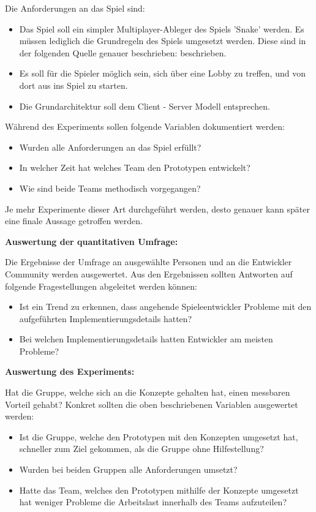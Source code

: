 Die Anforderungen an das Spiel sind:

\begin{itemize}
	\item Das Spiel soll ein simpler Multiplayer-Ableger des Spiels 'Snake' werden. Es müssen lediglich die Grundregeln des Spiels umgesetzt werden. Diese sind in der folgenden Quelle genauer beschrieben: \cite{.22.02.2022} beschrieben.
	\item Es soll für die Spieler möglich sein, sich über eine Lobby zu treffen, und von dort aus ins Spiel zu starten.
	\item Die Grundarchitektur soll dem Client - Server Modell entsprechen.
\end{itemize}

Während des Experiments sollen folgende Variablen dokumentiert werden:

\begin{itemize}
	\item Wurden alle Anforderungen an das Spiel erfüllt?
	\item In welcher Zeit hat welches Team den Prototypen entwickelt?
	\item Wie sind beide Teams methodisch vorgegangen?
\end{itemize}

Je mehr Experimente dieser Art durchgeführt werden, desto genauer kann später eine finale Aussage getroffen werden.

\textbf{Auswertung der quantitativen Umfrage:}

Die Ergebnisse der Umfrage an ausgewählte Personen und an die Entwickler Community werden ausgewertet. Aus den Ergebnissen sollten Antworten auf folgende Fragestellungen abgeleitet werden können:

\begin{itemize}
	\item Ist ein Trend zu erkennen, dass angehende Spieleentwickler Probleme mit den aufgeführten Implementierungsdetails hatten?
	\item Bei welchen Implementierungsdetails hatten Entwickler am meisten Probleme?
\end{itemize}

\textbf{Auswertung des Experiments:}

Hat die Gruppe, welche sich an die Konzepte gehalten hat, einen messbaren Vorteil gehabt? Konkret sollten die oben beschriebenen Variablen ausgewertet werden:

\begin{itemize}
	\item Ist die Gruppe, welche den Prototypen mit den Konzepten umgesetzt hat, schneller zum Ziel gekommen, als die Gruppe ohne Hilfestellung?
	\item Wurden bei beiden Gruppen alle Anforderungen umsetzt?
	\item Hatte das Team, welches den Prototypen mithilfe der Konzepte umgesetzt hat weniger Probleme die Arbeitslast innerhalb des Teams aufzuteilen?
\end{itemize}

